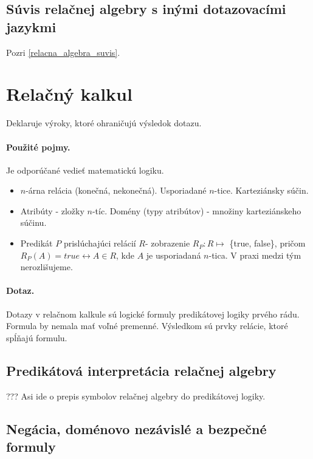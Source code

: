 \documentclass[10pt,a4paper]{article}
\begin{document}
\subsection{Súvis relačnej algebry s inými dotazovacími jazykmi}
Pozri \ref{relacna_algebra_suvis}.
    
\section{Relačný kalkul} 
\label{relacny_kalkul}

Deklaruje výroky, ktoré ohraničujú výsledok dotazu. 
\paragraph{Použité pojmy.}
Je odporúčané vedieť matematickú logiku. 

\begin{itemize}
\item $n$-árna relácia (konečná, nekonečná). Usporiadané $n$-tice. Karteziánsky súčin. 
\item Atribúty - zložky $n$-tíc. Domény (typy atribútov) - množiny karteziánskeho súčinu. 
\item Predikát $P$ prislúchajúci relácií $R$- zobrazenie $R_P : R \mapsto$ \{true, false\}, pričom $R_P(A) = true \leftrightarrow A \in R$, kde $A$ je usporiadaná $n$-tica. V praxi medzi tým nerozlišujeme. 
\end{itemize}

\paragraph{Dotaz.}
Dotazy v relačnom kalkule sú logické formuly predikátovej logiky prvého rádu.
Formula by nemala mať voľné premenné. Výsledkom sú prvky relácie, ktoré spĺňajú formulu. 

\subsection{Predikátová interpretácia relačnej algebry}
??? Asi ide o prepis symbolov relačnej algebry do predikátovej logiky. 

\subsection{Negácia, doménovo nezávislé a bezpečné formuly}
\end{document}

